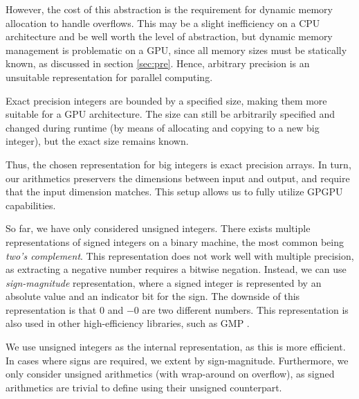 However, the cost of this abstraction is the requirement for dynamic memory
allocation to handle overflows. This may be a slight inefficiency on a CPU
architecture and be well worth the level of abstraction, but dynamic memory
management is problematic on a GPU, since all memory sizes must be statically
known, as discussed in section \ref{sec:pre}. Hence, arbitrary precision is an
unsuitable representation for parallel computing.

Exact precision integers are bounded by a specified size, making them more
suitable for a GPU architecture. The size can still be arbitrarily specified and
changed during runtime (by means of allocating and copying to a new big
integer), but the exact size remains known.

Thus, the chosen representation for big integers is exact precision arrays. In
turn, our arithmetics preservers the dimensions between input and output, and
require that the input dimension matches. This setup allows us to fully utilize
GPGPU capabilities.

So far, we have only considered unsigned integers. There exists multiple
representations of signed integers on a binary machine, the most common being
\textit{two's complement}. This representation does not work well with multiple
precision, as extracting a negative number requires a bitwise negation. Instead,
we can use \textit{sign-magnitude} representation, where a signed integer is
represented by an absolute value and an indicator bit for the sign. The downside
of this representation is that $0$ and $-0$ are two different numbers. This
representation is also used in other high-efficiency libraries, such as GMP
\cite{GMP}.

We use unsigned integers as the internal representation, as this is more
efficient. In cases where signs are required, we extent by
sign-magnitude. Furthermore, we only consider unsigned arithmetics (with
wrap-around on overflow), as signed arithmetics are trivial to define using
their unsigned counterpart.


